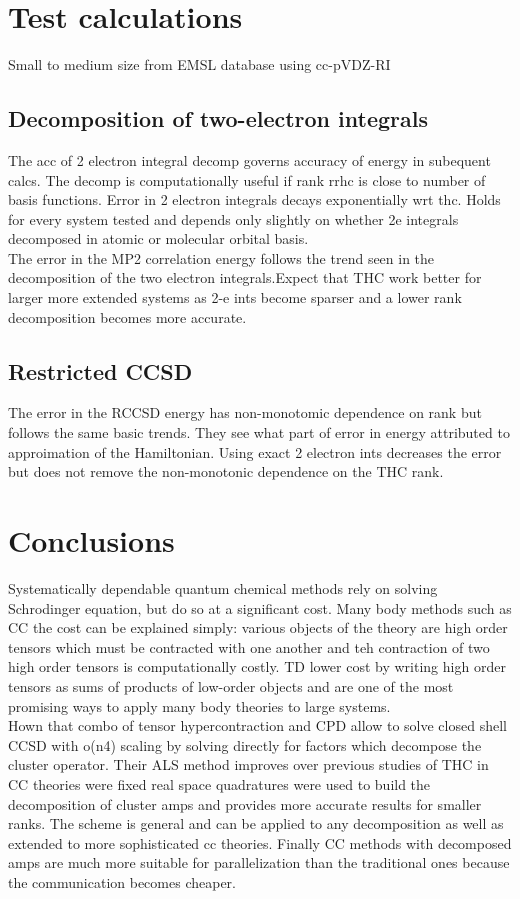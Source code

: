 \documentclass[10pt, draft]{article}
\begin{document}
\section{Test calculations}
Small to medium size from EMSL database using cc-pVDZ-RI 
\subsection{Decomposition of two-electron integrals}
The acc of 2 electron integral decomp governs accuracy of energy in subequent calcs.  The decomp is computationally useful if rank rrhc is close to number of basis functions.  Error in 2 electron integrals decays exponentially wrt thc.  Holds for every system tested and depends only slightly on whether 2e integrals decomposed in atomic or molecular orbital basis. \\
The error in the MP2 correlation energy follows the trend seen in the decomposition of the two electron integrals.Expect that THC work better for larger more extended systems as 2-e ints become sparser and a lower rank decomposition becomes more accurate.

\subsection{Restricted CCSD}
The error in the RCCSD energy has non-monotomic dependence on rank but follows the same basic trends.  They see what part of error in energy attributed to approimation of the Hamiltonian.  Using exact 2 electron ints decreases the error but does not remove the non-monotonic dependence on the THC rank.  

\section{Conclusions}
Systematically dependable quantum chemical methods rely on solving Schrodinger equation, but do so at a significant cost.  Many body methods such as CC the cost can be explained simply: various objects of the theory are high order tensors which must be contracted with one another and teh contraction of two high order tensors is computationally costly.  
TD lower cost by writing high order tensors as sums of products of low-order objects and are one of the most promising ways to apply many body theories to large systems.\\
Hown that combo of tensor hypercontraction and CPD allow to solve closed shell CCSD with o(n4) scaling by solving directly for factors which decompose the cluster operator.  Their ALS method improves over previous studies of THC in CC theories were fixed real space quadratures were used to build the decomposition of cluster amps and provides more accurate results for smaller ranks.  The scheme is general and can be applied to any decomposition as well as extended to more sophisticated cc theories.  Finally CC methods with decomposed amps are much more suitable for parallelization than the traditional ones because the communication becomes cheaper.
\end{document}

